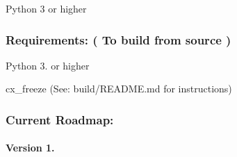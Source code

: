 \begin{DoxyItemize}
\item Python 3 or higher
\end{DoxyItemize}

\subsubsection*{Requirements\-: ( To build from source )}


\begin{DoxyItemize}
\item Python 3. or higher
\item cx\-\_\-freeze (See\-: build/\-R\-E\-A\-D\-M\-E.\-md for instructions)
\end{DoxyItemize}

\subsubsection*{Current Roadmap\-:}

\paragraph*{Version 1.}


